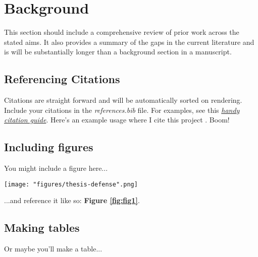 \center

\section{Background}

\raggedright

This section should include a comprehensive review of prior work across the stated aims. It also provides a summary of the gaps in the current literature and is will be substantially longer than a background section in a manuscript.


\subsection{Referencing Citations}

Citations are straight forward and will be automatically sorted on rendering. Include your citations in the \textit{references.bib} file. For examples, see this  \textit{\href{https://libguides.nps.edu/citation/ieee-bibtex}{handy citation guide}}. Here's an example usage where I cite this project \cite{OHSU-overleaf-dissertation-template}. Boom!


\subsection{Including figures}

You might include a figure here...

\begin{figure*}
  \centering
  \texttt{[image: "figures/thesis-defense".png]}
  \caption{\textbf{The best thesis defense is a good thesis offense.} A conceptual illustration of the celebrated thesis \textit{offense}, an ambitious but often effective tactical maneuver.}
  \label{fig:fig1}
\end{figure*}

...and reference it like so: \textbf{Figure \ref{fig:fig1}}.


\subsection{Making tables}

Or maybe you'll make a table...

